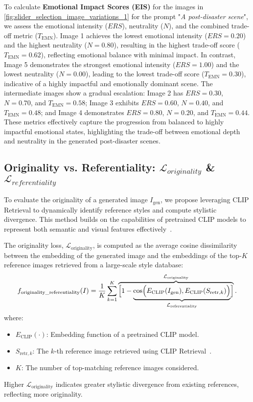 To calculate \textbf{Emotional Impact Scores (EIS)} for the images in \cref{fig:slider_selection_image_variations_1} for the prompt "\emph{A post-disaster scene}", we assess the emotional intensity (\(ERS\)), neutrality (\(N\)), and the combined trade-off metric (\(T_{\text{EMN}}\)). Image 1 achieves the lowest emotional intensity (\(ERS = 0.20\)) and the highest neutrality (\(N = 0.80\)), resulting in the highest trade-off score (\(T_{\text{EMN}} = 0.62\)), reflecting emotional balance with minimal impact. In contrast, Image 5 demonstrates the strongest emotional intensity (\(ERS = 1.00\)) and the lowest neutrality (\(N = 0.00\)), leading to the lowest trade-off score (\(T_{\text{EMN}} = 0.30\)), indicative of a highly impactful and emotionally dominant scene. The intermediate images show a gradual escalation: Image 2 has \(ERS = 0.30\), \(N = 0.70\), and \(T_{\text{EMN}} = 0.58\); Image 3 exhibits \(ERS = 0.60\), \(N = 0.40\), and \(T_{\text{EMN}} = 0.48\); and Image 4 demonstrates \(ERS = 0.80\), \(N = 0.20\), and \(T_{\text{EMN}} = 0.44\). These metrics effectively capture the progression from balanced to highly impactful emotional states, highlighting the trade-off between emotional depth and neutrality in the generated post-disaster scenes.




\subsection{Originality vs. Referentiality: $\mathcal{L}_{originality}$ \& $\mathcal{L}_{referentiality}$}

To evaluate the originality of a generated image \(I_{\text{gen}}\), we propose leveraging CLIP Retrieval to dynamically identify reference styles and compute stylistic divergence. This method builds on the capabilities of pretrained CLIP models to represent both semantic and visual features effectively~\cite{radford2021learning, clip-retrieval-2023}.

The originality loss, \(\mathcal{L}_{\text{originality}}\), is computed as the average cosine dissimilarity between the embedding of the generated image and the embeddings of the top-\(K\) reference images retrieved from a large-scale style database:
\[
f_{\text{originality\_referentiality}}(I) = \frac{1}{K} \sum_{k=1}^{K} 
\overbrace{\Bigl[ 1 - \underbrace{\cos\Bigl(E_{\text{CLIP}}(I_{\text{gen}}), E_{\text{CLIP}}(S_{\text{retr},k})\Bigr)}_{\mathcal{L}_{\text{referentiality}}} \Bigr]}^{\mathcal{L}_{\text{originality}}}.
\]
where:
\begin{itemize}
    \item \(E_{\text{CLIP}}(\cdot)\): Embedding function of a pretrained CLIP model.
    \item \(S_{\text{retr},k}\): The \(k\)-th reference image retrieved using CLIP Retrieval~\cite{clip-retrieval-2023}.
    \item \(K\): The number of top-matching reference images considered.
\end{itemize}
Higher \(\mathcal{L}_{\text{originality}}\) indicates greater stylistic divergence from existing references, reflecting more originality.

